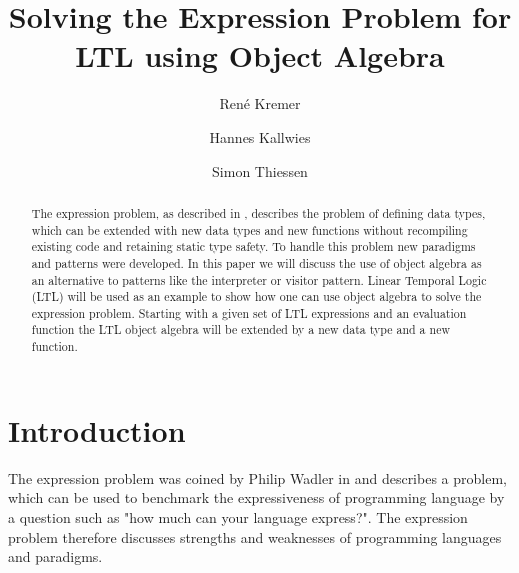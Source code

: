 \documentclass{llncs}
\begin{document}
%
\frontmatter          %
%
\pagestyle{headings}  %
%
\mainmatter              %
%
\title{Solving the Expression Problem for LTL using Object Algebra}
%
%
\author{Ren\'e Kremer%
\and
Hannes Kallwies%
\and
Simon Thiessen%
}
%
%
%

\maketitle              %

\begin{abstract}
The expression problem, as described in \cite{wadler98}, describes the problem of defining data types, which can be extended with new data types and new functions without recompiling existing code and retaining static type safety. To handle this problem new paradigms and patterns were developed. In this paper we will discuss the use of object algebra as an alternative to patterns like the interpreter or visitor pattern. Linear Temporal Logic (LTL) \cite{pnueli77} will be used as an example to show how one can use object algebra to solve the expression problem. Starting with a given set of LTL expressions and an evaluation function the LTL object algebra will be extended by a new data type and a new function.

\end{abstract}
%
\section{Introduction} \label{sec:introduction}
The expression problem was coined by Philip Wadler in \cite{wadler98} and describes a problem, which can be used to benchmark the expressiveness of programming language by a question such as "how much can your language express?". The expression problem therefore discusses strengths and weaknesses of programming languages and paradigms.
\end{document}

